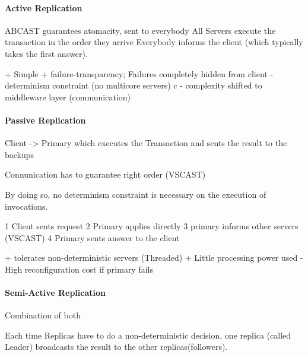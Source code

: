 \documentclass[a4paper,12pt]{article}%
\begin{document}
 \paragraph{Active Replication}
 ABCAST guarantees atomacity, sent to everybody 
 All Servers execute the transaction in the order they arrive
 Everybody informs the client (which typically takes the first answer).
 
 + Simple
 + failure-transparency; Failures completely hidden from client
 - determinism constraint (no multicore servers) c
 - complexity shifted to middleware layer (communication)
 
 
 \paragraph{Passive Replication}
 Client -> Primary which executes the Transaction and sents the result to the backups
 
  Connunication has to guarantee right order (VSCAST)
 
 By
doing so, no determinism constraint is necessary on the execution of
invocations.

1 Client sents request
2 Primary applies directly
3 primary informs other servers (VSCAST)
4 Primary sents answer to the client

+ tolerates non-deterministic servers (Threaded)
+ Little processing power used
- High reconfiguration cost if primary fails

 \paragraph{Semi-Active Replication}
Combination of both

Each time Replicas have to do a non-deterministic decision, one replica (called Leader) broadcasts the result to the other replicas(followers).
 
 
 
 
 
 
 
 
 
 
 
 
 
 
 
\end{document}
